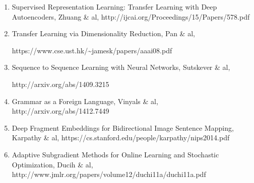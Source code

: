 \documentclass[12pt]{article}
\begin{document}
\begin{enumerate}
\def\labelenumi{\arabic{enumi}.}
\item
  Supervised Representation Learning: Transfer Learning with Deep
  Autoencoders, Zhuang \& al,
  http://ijcai.org/Proceedings/15/Papers/578.pdf
\item
  Transfer Learning via Dimensionality Reduction, Pan \& al,

  https://www.cse.ust.hk/\textasciitilde{}jamesk/papers/aaai08.pdf
\item
  Sequence to Sequence Learning with Neural Networks, Sutskever \& al,

  http://arxiv.org/abs/1409.3215
\item
  Grammar as a Foreign Language, Vinyals \& al,
  http://arxiv.org/abs/1412.7449
\item
  Deep Fragment Embeddings for Bidirectional Image Sentence Mapping,
  Karpathy \& al, https://cs.stanford.edu/people/karpathy/nips2014.pdf

\item Adaptive Subgradient Methods for Online Learning and Stochastic Optimization, Ducih \& al, http://www.jmlr.org/papers/volume12/duchi11a/duchi11a.pdf
\end{enumerate}

\end{document}

